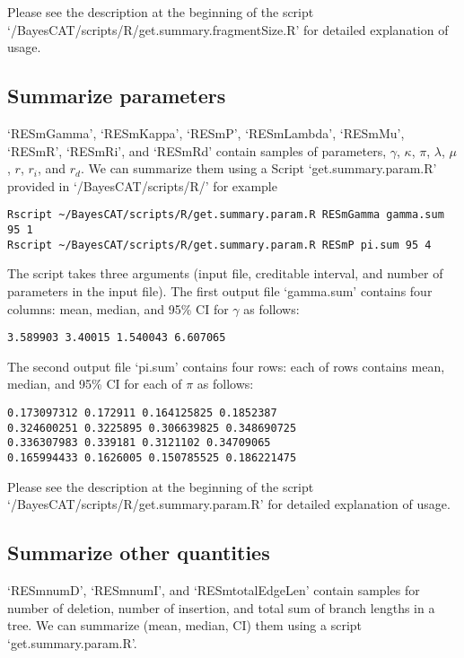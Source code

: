 \documentclass[11pt]{article}
\begin{document}
Please see the description at the beginning of the script `/BayesCAT/scripts/R/get.summary.fragmentSize.R' for detailed explanation of usage.

\subsection{Summarize parameters}
\label{sec-3-5}
`RESmGamma', `RESmKappa', `RESmP', `RESmLambda', `RESmMu', `RESmR', `RESmRi',  and `RESmRd' contain samples of parameters, $\gamma$, $\kappa$, $\pi$, $\lambda$, $\mu$, $r$, $r_i$, and $r_d$. We can summarize them using a Script `get.summary.param.R' provided in `/BayesCAT/scripts/R/' for example
\begin{lstlisting}
Rscript ~/BayesCAT/scripts/R/get.summary.param.R RESmGamma gamma.sum 95 1
Rscript ~/BayesCAT/scripts/R/get.summary.param.R RESmP pi.sum 95 4
\end{lstlisting}
The script takes three arguments (input file, creditable interval, and number of parameters in the input file). The first output file `gamma.sum' contains four columns: mean, median, and 95\% CI for $\gamma$ as follows:
\begin{lstlisting}
3.589903 3.40015 1.540043 6.607065
\end{lstlisting}

The second output file `pi.sum' contains four rows: each of rows contains mean, median, and 95\% CI for each of $\pi$ as follows:
\begin{lstlisting}
0.173097312 0.172911 0.164125825 0.1852387
0.324600251 0.3225895 0.306639825 0.348690725
0.336307983 0.339181 0.3121102 0.34709065
0.165994433 0.1626005 0.150785525 0.186221475
\end{lstlisting}

Please see the description at the beginning of the script `/BayesCAT/scripts/R/get.summary.param.R' for detailed explanation of usage.

\subsection{Summarize other quantities}
\label{sec-3-6}
`RESmnumD', `RESmnumI', and `RESmtotalEdgeLen' contain samples for number of deletion, number of insertion, and total sum of branch lengths in a tree. We can summarize (mean, median, CI) them using a script `get.summary.param.R'.
\end{document}
